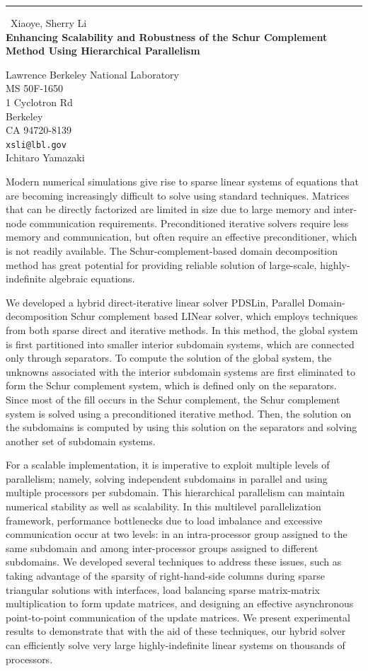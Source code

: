 \documentclass{report}
\begin{document}
\begin{center}
\rule{6in}{1pt} \
{\large Xiaoye, Sherry Li \\
{\bf Enhancing Scalability and Robustness of the Schur Complement Method Using Hierarchical Parallelism}}

Lawrence Berkeley National Laboratory \\ MS 50F-1650 \\ 1 Cyclotron Rd \\ Berkeley \\ CA 94720-8139
\\
{\tt xsli@lbl.gov}\\
Ichitaro Yamazaki\end{center}

Modern numerical simulations give rise to sparse linear systems of
equations that are becoming increasingly difficult to solve using
standard techniques. Matrices that can be directly factorized
are limited in size due to large memory and inter-node communication
requirements. Preconditioned iterative solvers require less memory
and communication, but often require an effective preconditioner, which
is not readily available.
The Schur-complement-based domain decomposition method
has great potential for providing reliable solution of large-scale,
highly-indefinite algebraic equations.

We developed a hybrid direct-iterative linear solver PDSLin,
Parallel Domain-decomposition Schur complement based LINear
solver, which employs techniques from both sparse direct and
iterative methods.
In this method, the global system is first partitioned into smaller
interior subdomain systems, which are connected only through
separators. To compute the solution of the global system,
the unknowns associated with the interior subdomain systems are
first eliminated to form the Schur complement system, which is defined
only on the separators. Since most of the fill occurs in
the Schur complement, the Schur complement system is solved
using a preconditioned iterative method. Then, the solution on the
subdomains is computed by using this solution on the separators and
solving another set of subdomain systems.

For a scalable implementation, it is imperative to exploit multiple
levels of parallelism; namely, solving independent subdomains
in parallel and using multiple processors per subdomain.
This hierarchical parallelism can maintain numerical stability
as well as scalability.
In this multilevel parallelization framework, performance
bottlenecks due to load imbalance and excessive communication
occur at two levels: in an intra-processor group assigned to the
same subdomain and among inter-processor groups assigned to different
subdomains. We developed several techniques to address these issues,
such as taking advantage of the sparsity of right-hand-side columns
during sparse triangular solutions with interfaces, load balancing
sparse matrix-matrix multiplication to form update matrices, and
designing an effective asynchronous point-to-point communication
of the update matrices. We present experimental results to demonstrate
that with the aid of these techniques, our hybrid solver can efficiently
solve very large highly-indefinite linear systems on thousands
of processors.
\end{document}
